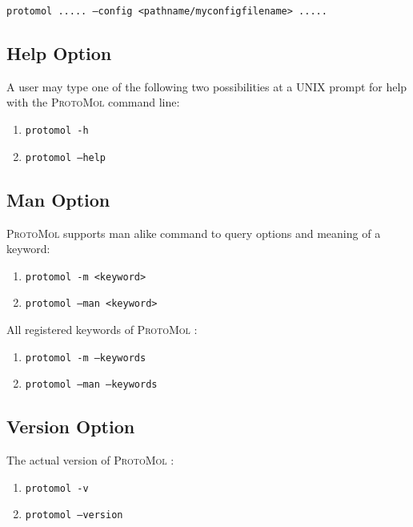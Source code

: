 \documentclass[11pt]{report}
\newcommand{\ProtoMol}{\textsc{ProtoMol }}
\providecommand{\ttsmall}[1]{\texttt{\small\mbox{#1}}}
\begin{document}
\ttsmall{\indent protomol ..... --config <pathname/myconfigfilename> .....}

\subsection{Help Option}

A user may type one of the following two possibilities at a UNIX
prompt for help with the \ProtoMol command line: \\ 
\begin{enumerate}
\item \ttsmall{protomol -h} 
\item \ttsmall{protomol --help} 
\end{enumerate}

\subsection{Man Option}


\ProtoMol supports man alike command to query options and meaning of a
keyword: \\ 
\begin{enumerate}
\item \ttsmall{protomol -m <keyword>} 
\item \ttsmall{protomol --man <keyword>} 
\end{enumerate}

All registered keywords of \ProtoMol: \\
\begin{enumerate}
\item \ttsmall{protomol -m --keywords} 
\item \ttsmall{protomol --man --keywords} 
\end{enumerate}


\subsection{Version Option}

The actual version of \ProtoMol : \\ 
\begin{enumerate}
\item \ttsmall{protomol -v} 
\item \ttsmall{protomol --version} 
\end{enumerate}
\end{document}
